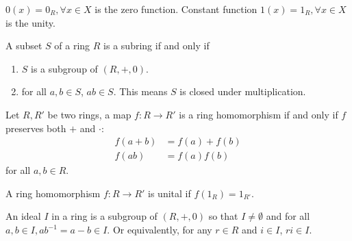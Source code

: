\documentclass[10pt]{article}
\begin{document}
\begin{remark}
    $0(x)=0_{R}, \forall x\in X$ is the zero function. Constant function $1(x)=1_{R}, \forall x\in X$ is the unity.
\end{remark}
\begin{hdefinition}[subring]
    A subset $S$ of a ring $R$ is a subring if and only if 
    \begin{enumerate}
        \item $S$ is a subgroup of $(R,+,0)$.
        \item for all $a,b\in S$, $ab\in S$. This means $S$ is closed under multiplication. 
    \end{enumerate}
\end{hdefinition}
\begin{hdefinition}
    Let $R,R'$ be two rings, a map $f: R\to R'$ is a ring homomorphism if and only if $f$ preserves both $+$ and $\cdot$:
    \begin{align*}
        f(a+b)&=f(a)+f(b)\\
        f(ab)&=f(a)f(b)
    \end{align*}
    for all $a,b\in R$.
\end{hdefinition}
\begin{hdefinition}
    A ring homomorphism $f:R\to R'$ is unital if $f(1_R)=1_{R'}$.
\end{hdefinition}
\begin{hdefinition}[ideal]
    An ideal $I$ in a ring is a subgroup of $(R,+,0)$ so that  $I\neq\emptyset$ and  for all $a,b\in I,ab^{-1}=a-b\in I$. Or equivalently, for any $r\in R$ and $i\in I$, $ri\in I$.
\end{hdefinition}

\newpage
\end{document}
